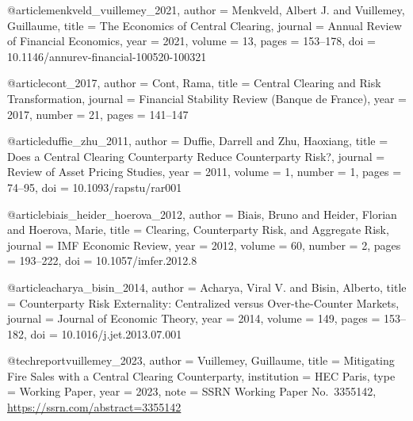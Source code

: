 @article{menkveld_vuillemey_2021,
  author  = {Menkveld, Albert J. and Vuillemey, Guillaume},
  title   = {The Economics of Central Clearing},
  journal = {Annual Review of Financial Economics},
  year    = {2021}, volume = {13}, pages = {153--178},
  doi     = {10.1146/annurev-financial-100520-100321}
}


@article{cont_2017,
  author  = {Cont, Rama},
  title   = {Central Clearing and Risk Transformation},
  journal = {Financial Stability Review (Banque de France)},
  year    = {2017}, number = {21}, pages = {141--147}
}


@article{duffie_zhu_2011,
  author  = {Duffie, Darrell and Zhu, Haoxiang},
  title   = {Does a Central Clearing Counterparty Reduce Counterparty Risk?},
  journal = {Review of Asset Pricing Studies},
  year    = {2011}, volume = {1}, number = {1}, pages = {74--95},
  doi     = {10.1093/rapstu/rar001}
}


@article{biais_heider_hoerova_2012,
  author  = {Biais, Bruno and Heider, Florian and Hoerova, Marie},
  title   = {Clearing, Counterparty Risk, and Aggregate Risk},
  journal = {IMF Economic Review},
  year    = {2012}, volume = {60}, number = {2}, pages = {193--222},
  doi     = {10.1057/imfer.2012.8}
}


@article{acharya_bisin_2014,
  author  = {Acharya, Viral V. and Bisin, Alberto},
  title   = {Counterparty Risk Externality: Centralized versus Over-the-Counter Markets},
  journal = {Journal of Economic Theory},
  year    = {2014}, volume = {149}, pages = {153--182},
  doi     = {10.1016/j.jet.2013.07.001}
}


@techreport{vuillemey_2023,
  author      = {Vuillemey, Guillaume},
  title       = {Mitigating Fire Sales with a Central Clearing Counterparty},
  institution = {HEC Paris}, type = {Working Paper}, year = {2023},
  note        = {SSRN Working Paper No.~3355142, \url{https://ssrn.com/abstract=3355142}}
}


